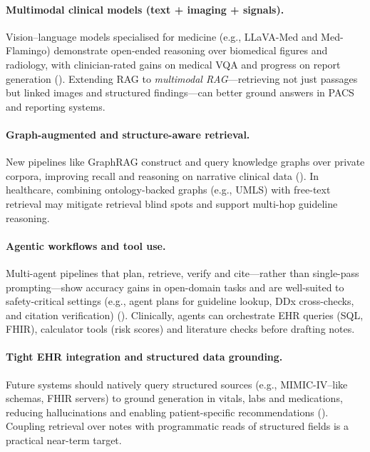 \paragraph{Multimodal clinical models (text + imaging + signals).}
Vision–language models specialised for medicine (e.g., LLaVA-Med and Med-Flamingo) demonstrate open-ended reasoning over biomedical figures and radiology, with clinician-rated gains on medical VQA and progress on report generation (\citep{llavamed2023,moor2023medflamingo,nature2024flamingocxr}). Extending RAG to \emph{multimodal RAG}—retrieving not just passages but linked images and structured findings—can better ground answers in PACS and reporting systems.

\paragraph{Graph-augmented and structure-aware retrieval.}
New pipelines like GraphRAG construct and query knowledge graphs over private corpora, improving recall and reasoning on narrative clinical data (\citep{larson2024graphrag,graphrag2024arxiv}). In healthcare, combining ontology-backed graphs (e.g., UMLS) with free-text retrieval may mitigate retrieval blind spots and support multi-hop guideline reasoning.

\paragraph{Agentic workflows and tool use.}
Multi-agent pipelines that plan, retrieve, verify and cite—rather than single-pass prompting—show accuracy gains in open-domain tasks and are well-suited to safety-critical settings (e.g., agent plans for guideline lookup, DDx cross-checks, and citation verification) (\citep{sun2025agenticrag}). Clinically, agents can orchestrate EHR queries (SQL, FHIR), calculator tools (risk scores) and literature checks before drafting notes.

\paragraph{Tight EHR integration and structured data grounding.}
Future systems should natively query structured sources (e.g., MIMIC-IV–like schemas, FHIR servers) to ground generation in vitals, labs and medications, reducing hallucinations and enabling patient-specific recommendations (\citep{yang2022gatortron}). Coupling retrieval over notes with programmatic reads of structured fields is a practical near-term target.

